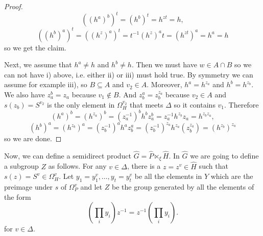 \documentclass[10pt]{amsart}
\theoremstyle{definition}
\theoremstyle{definition}
\numberwithin{equation}{section}
\begin{document}
\begin{proof}
\[((h^a)^b)^t=(h^b)^t=h^{zt}=h,\]
\[((h^b)^a)^t=((h^{z})^a)^t=t^{-1}(h^z)^at=(h^{zt})^a=h^a=h\]
so we get the claim.


Next, we assume that $h^a\neq h$ and $h^b\neq h$. Then we must have $w\in A\cap B$ so we can not have i) above, i.e. either ii) or iii) must hold true. By symmetry we can assume for example iii), so $B\subseteq A$ and $v_2\in A$. Moreover, $h^a=h^{z_a}$ and $h^b=h^{z_b}$.
We also have $z_a^b=z_a$ because $v_1\not\in B$. And $z_b^a=z_b^{z_a}$ because $v_2\in A$ and $s(z_b)=S^{v_2}$ is the only element in $\Omega_H^{v_2}$ that meets $\Delta$ so it contains $v_1$. Therefore 
\[(h^a)^b=(h^{z_a})^b=(z_a^{-1})^bh^bz_a^b=z_a^{-1}h^{z_b}z_a=h^{z_bz_a},\]
\[(h^b)^a=(h^{z_b})^a=(z_b^{-1})^ah^az_b^a=(z_b^{-1})^{z_a}h^{z_a}(z_b^{z_a})=(h^{z_b})^{z_a}\]
so we are done.
\end{proof}


Now, we can define a semidirect product $\hat G=\hat P\ltimes_\xi\hat H$. In $\hat G$ we are going to define a subgroup $Z$ as follows. For any $v\in\Delta$, there is a $z = z^v\in\hat H$ such that $s(z)=S^v\in\Omega_H^v$. Let $y_1 = y^v_1,\ldots,y_t = y^v_t$ be all the elements in $Y$ which are the preimage under $s$ of $\Omega^v_P$ and let $Z$ be the group generated by all the elements of the form
\[(\prod_iy_i)z^{-1}=z^{-1}(\prod_iy_i).\]
for $v\in\Delta$. 
\end{document}
